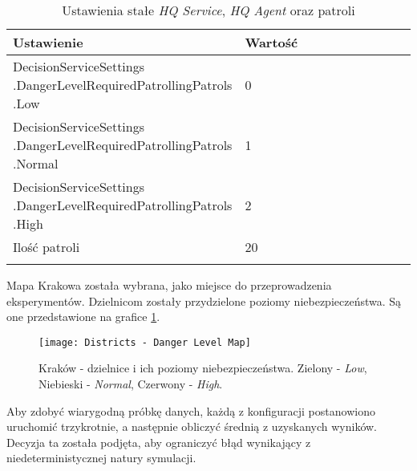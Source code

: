 \begin{longtable}{|p{0.5\linewidth} | p{0.5\linewidth}|} 
    \hline
    Ustawienie & Wartość \\
    \hline
    \hline
    \makecell[tl]{DecisionServiceSettings\\.DangerLevelRequiredPatrollingPatrols\\.Low} & 0 \\
    \hline
    \makecell[tl]{DecisionServiceSettings\\.DangerLevelRequiredPatrollingPatrols\\.Normal} & 1 \\
    \hline
    \makecell[tl]{DecisionServiceSettings\\.DangerLevelRequiredPatrollingPatrols\\.High} & 2 \\
    \hline
    Ilość patroli & 20 \\
    \hline
\caption{Ustawienia stałe \emph{HQ Service}, \emph{HQ Agent} oraz patroli}
\label{tab:ustawieniaHqService}
\end{longtable}

\par Mapa Krakowa została wybrana, jako miejsce do przeprowadzenia eksperymentów. Dzielnicom zostały przydzielone poziomy niebezpieczeństwa. Są one przedstawione na grafice \ref{fig:districtDangerLevelMap}.

\begin{figure}
    \centering
    \texttt{[image: Districts - Danger Level Map]}
    \caption{Kraków - dzielnice i ich poziomy niebezpieczeństwa. Zielony - \emph{Low}, Niebieski - \emph{Normal}, Czerwony - \emph{High}.}
    \label{fig:districtDangerLevelMap}
\end{figure}

\par Aby zdobyć wiarygodną próbkę danych, każdą z konfiguracji postanowiono uruchomić trzykrotnie, a następnie obliczyć średnią z uzyskanych wyników. Decyzja ta została podjęta, aby ograniczyć błąd wynikający z niedeterministycznej natury symulacji.
